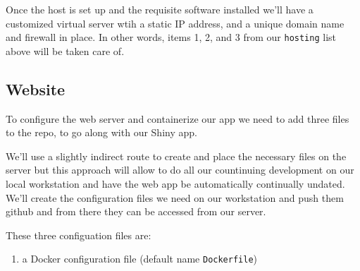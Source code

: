 \documentclass[
  letterpaper,
  DIV=11,
  numbers=noendperiod,
  oneside]{scrartcl}
\providecommand{\tightlist}{%
  \setlength{\itemsep}{0pt}\setlength{\parskip}{0pt}}\usepackage{longtable,booktabs,array}
\begin{document}
Once the host is set up and the requisite software installed we'll have
a customized virtual server wtih a static IP address, and a unique
domain name and firewall in place. In other words, items 1, 2, and 3
from our \texttt{hosting} list above will be taken care of.

\hypertarget{website}{%
\subsection{Website}\label{website}}

To configure the web server and containerize our app we need to add
three files to the repo, to go along with our Shiny app.

We'll use a slightly indirect route to create and place the necessary
files on the server but this approach will allow to do all our
countinuing development on our local workstation and have the web app be
automatically continually undated. We'll create the configuration files
we need on our workstation and push them github and from there they can
be accessed from our server.

These three configuation files are:

\begin{enumerate}
\def\labelenumi{\arabic{enumi}.}
\tightlist
\item
  a Docker configuration file (default name \texttt{Dockerfile})
\end{enumerate}

\end{document}
